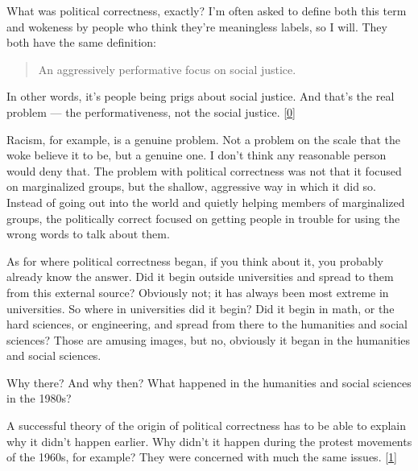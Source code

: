 What
                  was political correctness, exactly? I'm often asked to define
                  both this term and wokeness by people who think they're
                  meaningless labels, so I will. They both have the same
                  definition:
                  \begin{quote}

                    An aggressively performative focus on social justice.
                  
\end{quote}

                  In other words, it's people being prigs about social justice.
                  And that's the real problem --- the performativeness, not
                  the social justice.
                  [\href{\#f0n}{0}]

Racism, for example, is a genuine problem. Not a
                  problem on the scale that the woke believe it to be, but a
                  genuine one. I don't think any reasonable person would deny
                  that. The problem with political correctness was not that it
                  focused on marginalized groups, but the shallow, aggressive
                  way in which it did so. Instead of going out into the world
                  and quietly helping members of marginalized groups, the
                  politically correct focused on getting people in trouble for
                  using the wrong words to talk about them.

As for
                  where political correctness began, if you think about it, you
                  probably already know the answer. Did it begin outside
                  universities and spread to them from this external source?
                  Obviously not; it has always been most extreme in
                  universities. So where in universities did it begin? Did it
                  begin in math, or the hard sciences, or engineering, and
                  spread from there to the humanities and social sciences? Those
                  are amusing images, but no, obviously it began in the
                  humanities and social sciences.

Why there? And why
                  then? What happened in the humanities and social sciences in
                  the 1980s?

A successful theory of the origin of
                  political correctness has to be able to explain why it didn't
                  happen earlier. Why didn't it happen during the protest
                  movements of the 1960s, for example? They were concerned with
                  much the same issues.
                  [\href{\#f1n}{1}]

